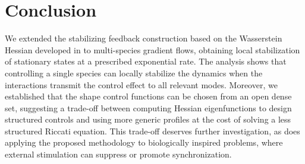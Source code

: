 \documentclass[letterpaper, 10pt, conference]{ieeeconf}
\begin{document}
\section{Conclusion}
\label{sec:conclusion}

We extended the stabilizing feedback construction based on the Wasserstein Hessian developed in \cite{KaliseMoschenPavliotis2026} to multi-species gradient flows, obtaining local stabilization of stationary states at a prescribed exponential rate.
The analysis shows that controlling a single species can locally stabilize the dynamics when the interactions transmit the control effect to all relevant modes.
Moreover, we established that the shape control functions can be chosen from an open dense set, suggesting a trade-off between computing Hessian eigenfunctions to design structured controls and using more generic profiles at the cost of solving a less structured Riccati equation.
This trade-off deserves further investigation, as does applying the proposed methodology to biologically inspired problems, where external stimulation can suppress or promote synchronization.



\end{document}

